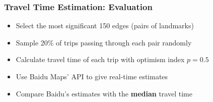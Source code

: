 \documentclass{beamer}
\theoremstyle{definition}
\begin{document}
\begin{frame}
\frametitle{Travel Time Estimation: Evaluation}
\begin{itemize}
	\item <2-> Select the most significant 150 edges (pairs of landmarks)
	\item <3-> Sample 20\% of trips passing through each pair randomly
	\item <4-> Calculate travel time of each trip with optimism index $p = 0.5$
	\item <5-> Use Baidu Maps' API to give real-time estimates
	\item <6-> Compare Baidu's estimates with the \textbf{median} travel time 
\end{itemize}
\end{frame}
\end{document}
